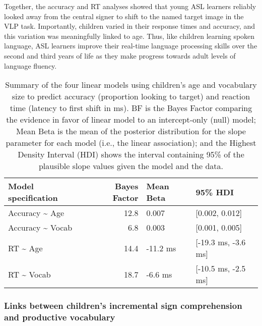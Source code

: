 \documentclass[oneside]{report}
\begin{document}
Together, the accuracy and RT analyses showed that young ASL learners
reliably looked away from the central signer to shift to the named
target image in the VLP task. Importantly, children varied in their
response times and accuracy, and this variation was meaningfully linked
to age. Thus, like children learning spoken language, ASL learners
improve their real-time language processing skills over the second and
third years of life as they make progress towards adult levels of
language fluency.
\begin{longtable}[t]{>{\raggedright\arraybackslash}p{4cm}rll}
\caption[Summary of the four linear models using children's age and vocabulary size to predict accuracy and reaction time]{\label{tab:sol-bf-table}Summary of the four linear models using children's age and vocabulary size to predict accuracy (proportion looking to target) and reaction time (latency to first shift in ms). BF is the Bayes Factor comparing the evidence in favor of linear model to an intercept-only (null) model; Mean Beta is the mean of the posterior distribution for the slope parameter for each model (i.e., the linear association); and the Highest Density Interval (HDI) shows the interval containing 95\% of the plausible slope values given the model and the data.}\\
\toprule
\textbf{Model specification} & \textbf{Bayes Factor} & \textbf{Mean Beta} & \textbf{95\% HDI}\\
\midrule
Accuracy \textasciitilde{} Age & 12.8 & 0.007 & [0.002, 0.012]\\
Accuracy \textasciitilde{} Vocab & 6.8 & 0.003 & [0.001, 0.005]\\
RT \textasciitilde{} Age & 14.4 & -11.2 ms & [-19.3 ms, -3.6 ms]\\
RT \textasciitilde{} Vocab & 18.7 & -6.6 ms & [-10.5 ms, -2.5 ms]\\
\bottomrule
\end{longtable}
\subsubsection{Links between children's incremental sign comprehension
and productive
vocabulary}\label{links-between-childrens-incremental-sign-comprehension-and-productive-vocabulary}
\end{document}
